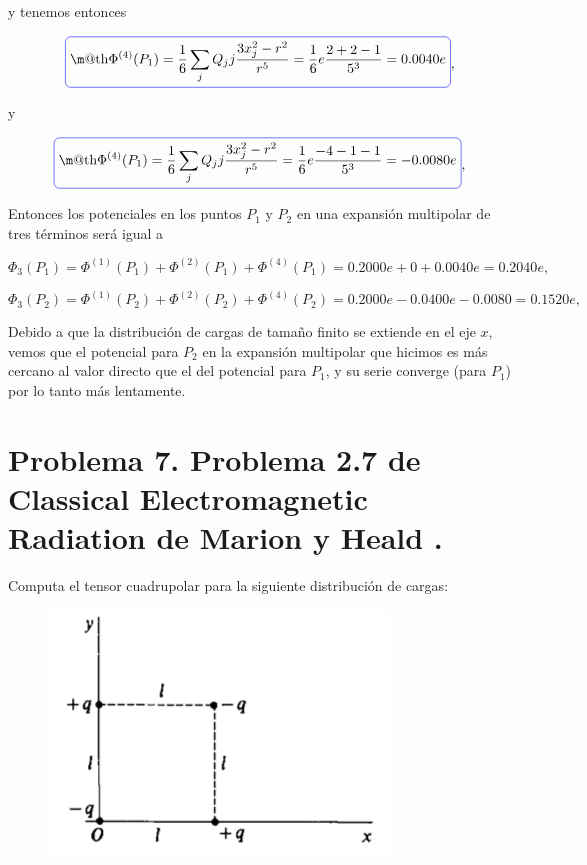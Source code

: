 \documentclass[a4paper,11pt]{article}
\makeatletter
\numberwithin{equation}{section}
\newcommand*{\boxcolor}{blue}
\renewcommand{\boxed}[1]{\textcolor{\boxcolor}{%
\tikz[baseline={([yshift=-1ex]current bounding box.center)}] \node [rectangle, minimum width=1ex,rounded corners,draw] {\normalcolor\m@th$\displaystyle#1$};}}
\makeatother
\begin{document}
y tenemos entonces 

\begin{equation}
 \boxed{\Phi^{(4)}(P_1) = \frac{1}{6}\sum_j Q_jj \frac{3x_j^2 - r^2}{r^5} = 
 \frac{1}{6}e\frac{2 + 2 - 1}{5^3} = 0.0040 e},
\end{equation}

y 

\begin{equation}
 \boxed{\Phi^{(4)}(P_1) = \frac{1}{6}\sum_j Q_jj \frac{3x_j^2 - r^2}{r^5} = 
 \frac{1}{6}e\frac{-4 -1 - 1}{5^3} = -0.0080 e},
\end{equation}

Entonces los potenciales en los puntos $P_1$ y $P_2$ en una expansión multipolar de 
tres términos será igual a 

\begin{equation}
 \Phi_3(P_1) = \Phi^{(1)}(P_1) + \Phi^{(2)}(P_1) + \Phi^{(4)}(P_1) 
 = 0.2000 e + 0 + 0.0040 e = 0.2040 e,
\end{equation}

\begin{equation}
 \Phi_3(P_2) = \Phi^{(1)}(P_2) + \Phi^{(2)}(P_2) + \Phi^{(4)}(P_2)
 = 0.2000 e - 0.0400e - 0.0080 = 0.1520 e,
\end{equation}

Debido a que la distribución de cargas de tamaño finito se extiende en el eje $x$, 
vemos que el potencial para $P_2$ en la expansión multipolar que hicimos es más
cercano al valor directo que el del potencial para $P_1$, y su serie converge (para 
$P_1$) por lo tanto más lentamente.

\section{Problema 7. Problema 2.7 de Classical Electromagnetic Radiation
de Marion y Heald \cite{marion2}.}

Computa el tensor cuadrupolar para la siguiente distribución de cargas:

\begin{figure}[H]
\center
 \includegraphics[scale=0.6]{problema7fig1}
\end{figure}
\end{document}
